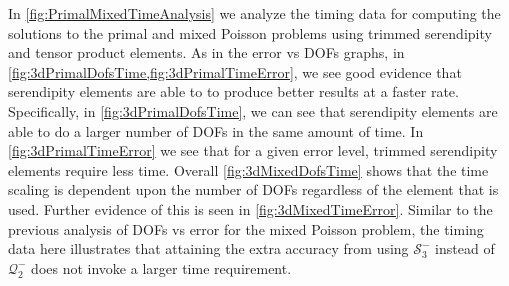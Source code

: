 \documentclass[format=acmsmall,screen,timestamp=false,a4paper]{acmart}
\begin{document}
In \cref{fig:PrimalMixedTimeAnalysis} we analyze the timing data for computing the solutions to the primal and mixed Poisson problems using trimmed serendipity and tensor product elements.  As in the error vs DOFs graphs, in \cref{fig:3dPrimalDofsTime,fig:3dPrimalTimeError}, we see good evidence that serendipity elements are able to to produce better results at a faster rate.  Specifically, in \cref{fig:3dPrimalDofsTime}, we can see that serendipity elements are able to do a larger number of DOFs in the same amount of time.  In \cref{fig:3dPrimalTimeError} we see that for a given error level, trimmed serendipity elements require less time.  Overall \cref{fig:3dMixedDofsTime} shows that the time scaling is dependent upon the number of DOFs regardless of the element that is used.  Further evidence of this is seen in \cref{fig:3dMixedTimeError}.  Similar to the previous analysis of DOFs vs error for the mixed Poisson problem, the timing data here illustrates that attaining the extra accuracy from using $\mathcal{S}^-_3$ instead of $\mathcal{Q}^-_2$ does not invoke a larger time requirement.  



\end{document}
